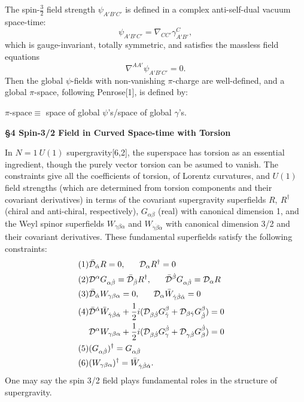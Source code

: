 \documentclass[a4paper,12pt]{article}
\begin{document}
The spin-$\frac{3}{2}$ field strength $\psi_{A'B'C'}$ is defined in a complex anti-self-dual vacuum space-time:
\begin{equation}
\psi_{A'B'C'}=\nabla_{CC'}\gamma^C_{A'B'},
\end{equation}
which is gauge-invariant, totally symmetric, and satisfies the massless field equations
\begin{equation}
\nabla^{AA'}\psi_{A'B'C'}=0.
\end{equation}
Then the global $\psi$-fields with non-vanishing $\pi$-charge are well-defined, and a global $\pi$-space, following Penrose[1], is defined by:\par
$\pi$-space$\equiv$ space of global $\psi$'s/space of global $\gamma$'s.\par

\vskip 16pt
{\bf \S 4 Spin-3/2 Field in Curved Space-time with Torsion}
\vskip 16pt

In $N=1\ U(1)$ supergravity[6,2], the superspace has torsion as an essential ingredient, though the purely vector torsion can be asumed to vanish. 
The constraints give all the coefficients of torsion, of Lorentz curvatures, and $U(1)$ field strengths (which are determined from torsion components and their covariant derivatives) in terms of the covariant supergravity superfields $R,\ {R}^\dag$ (chiral and anti-chiral, respectively), $G_{\alpha\beta}$ (real) with canonical dimension 1, and the Weyl spinor superfields $W_{\gamma\beta\alpha}$ and $W_{\dot\gamma\dot\beta\dot\alpha}$ with canonical dimension 3/2 and their covariant derivatives. These fundamental superfields satisfy the following constraints:
\begin{align*}
(1)&\bar{\cal D}_{\dot\alpha}R=0,\ \ \ \ \ {\cal D}_{\alpha}R^\dag=0\cr
(2)&{\cal D}^{\alpha}G_{\alpha\dot\beta}=\bar{\cal D}_{\dot\beta}R^\dag,\ \ \ \ \ \bar{\cal D}^{\dot\beta}G_{\alpha\dot\beta}={\cal D}_{\alpha}R\cr
(3)&\bar{\cal D}_{\dot\alpha}W_{\gamma\beta\alpha}=0,\ \ \ \ \ {\cal D}_{\alpha}{\bar W}_{\dot\gamma\dot\beta\dot\alpha}=0\cr
(4)&\bar{\cal D}^{\dot\alpha}{\bar W}_{\dot\gamma\dot\beta\dot\alpha}+\frac{1}{2}i({\cal D}_{\beta\dot\beta}G^\beta_{\dot\gamma}+{\cal D}_{\beta\dot\gamma}G^{\beta}_{\dot\beta})=0\cr
&{\cal D}^{\alpha}W_{\gamma\beta\alpha}+\frac{1}{2}i({\cal D}_{\beta\dot\beta}G^{\dot\beta}_{\gamma}+{\cal D}_{\gamma\dot\beta}G^{\dot\beta}_{\beta})=0\cr
(5)&(G_{\alpha\dot\beta})^\dag=G_{\alpha\dot\beta}\cr
(6)&(W_{\gamma\beta\alpha})^\dag={\bar W}_{\dot\gamma\dot\beta\dot\alpha}.
\end{align*}
One may say the spin 3/2 field plays fundamental roles in the structure of supergravity.
\end{document}
